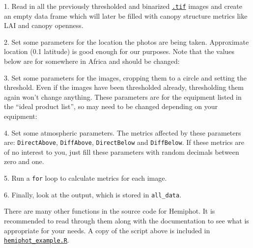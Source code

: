 \documentclass[11pt,a4paper]{article}
\newcommand\file[1]{\texttt{\underline{#1}}}  %
\begin{document}
\begin{minipage}{\linewidth}
1. Read in all the previously thresholded and binarized \file{.tif} images and create an empty data frame which will later be filled with canopy structure metrics like LAI and canopy openness.

\end{minipage}


\begin{minipage}{\linewidth}
	2. Set some parameters for the location the photos are being taken. Approximate location (0.1\textdegree{} latitude) is good enough for our purposes. Note that the values below are for somewhere in Africa and should be changed:

\end{minipage}


\begin{minipage}{\linewidth}
3. Set some parameters for the images, cropping them to a circle and setting the threshold. Even if the images have been thresholded already, thresholding them again won't change anything. These parameters are for the equipment listed in the ``ideal product list'', so may need to be changed depending on your equipment:

\end{minipage}


\begin{minipage}{\linewidth}
4. Set some atmospheric parameters. The metrics affected by these parameters are: \verb|DirectAbove|, \verb|DiffAbove|, \verb|DirectBelow| and \verb|DiffBelow|. If these metrics are of no interest to you, just fill these parameters with random decimals between zero and one.

\end{minipage}


\begin{minipage}{\linewidth}
5. Run a \verb|for| loop to calculate metrics for each image.

\end{minipage}

6. Finally, look at the output, which is stored in \verb|all_data|.

There are many other functions in the source code for Hemiphot. It is recommended to read through them along with the documentation to see what is appropriate for your needs. A copy of the script above is included in \file{hemiphot\_example.R}.
\end{document}
